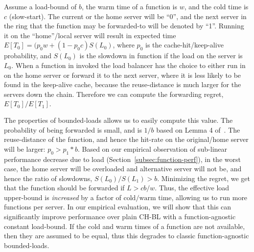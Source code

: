 

Assume a load-bound of $b$, the warm time of a function is $w$, and the cold time is $c$ (slow-start). 
%
The current or the home server will be ``0'', and the next server in the ring that the function may be forwarded-to will be denoted by ``1''. 
Running it on the ``home''/local server will result in expected time $E[T_0] = (p_0w+(1-p_0c)S(L_0) $, where $p_0$ is the cache-hit/keep-alive probability, and $S(L_0)$ is the slowdown in function if the load on the server is $L_0$. 
When a function in invoked the load balancer has the choice to either run in on the home server or forward it to the next server, where it is less likely to be found in the keep-alive cache, because the reuse-distance is much larger for the servers down the chain.
Therefore we can compute the forwarding regret, $E[T_0]/E[T_1]$.

The properties of bounded-loads allows us to easily compute this value.
The probability of being forwarded is small, and is $1/b$ based on Lemma 4 of~\cite{mirrokni2018consistent}.
The reuse-distance of the function, and hence the hit-rate on the original/home server will be larger: $p_0 > p_1*b$. 
Based on our empirical observation of sub-linear performance decrease due to load (Section~\ref{subsec:function-perf}), in the worst case, the home server will be overloaded and alternative server will not be, and hence the ratio of slowdowns, $S(L_0)/S(L_1) > b$.
%
Minimizing the regret, we get that the function should be forwarded if $L>cb/w$.
Thus, the effective load upper-bound is \emph{increased} by a factor of $\text{cold}/\text{warm}$  time, allowing us to run more functions per server. 
In our empirical evaluation, we will show that this can significantly improve performance over plain CH-BL with a function-agnostic constant load-bound.
If the cold and warm times of a function are not available, then they are assumed to be equal, thus this degrades to classic function-agnostic bounded-loads. 



\vspace*{-0.4cm}
